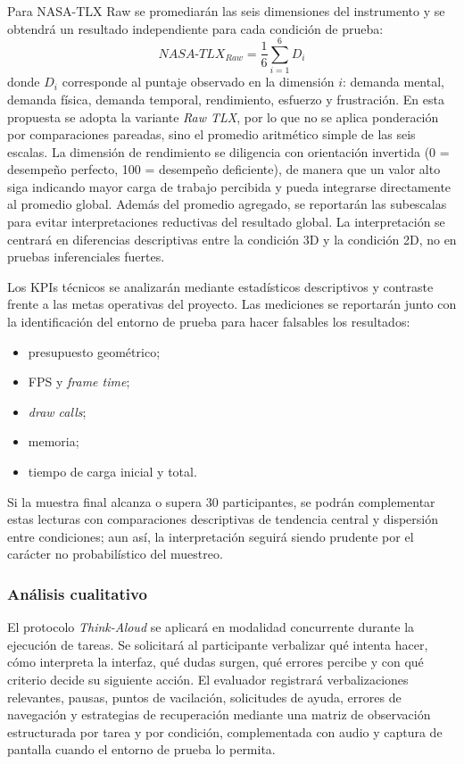 Para NASA-TLX Raw se promediar\'an las seis dimensiones del instrumento y se obtendr\'a un resultado independiente para cada condici\'on de prueba:
\[
NASA\text{-}TLX_{Raw} = \frac{1}{6}\sum_{i=1}^{6} D_i
\]
donde $D_i$ corresponde al puntaje observado en la dimensi\'on $i$: demanda mental, demanda f\'isica, demanda temporal, rendimiento, esfuerzo y frustraci\'on. En esta propuesta se adopta la variante \textit{Raw TLX}, por lo que no se aplica ponderaci\'on por comparaciones pareadas, sino el promedio aritm\'etico simple de las seis escalas. La dimensi\'on de rendimiento se diligencia con orientaci\'on invertida (0 = desempe\~no perfecto, 100 = desempe\~no deficiente), de manera que un valor alto siga indicando mayor carga de trabajo percibida y pueda integrarse directamente al promedio global. Adem\'as del promedio agregado, se reportar\'an las subescalas para evitar interpretaciones reductivas del resultado global. La interpretaci\'on se centrar\'a en diferencias descriptivas entre la condici\'on 3D y la condici\'on 2D, no en pruebas inferenciales fuertes.

Los KPIs t\'ecnicos se analizar\'an mediante estad\'isticos descriptivos y contraste frente a las metas operativas del proyecto. Las mediciones se reportar\'an junto con la identificaci\'on del entorno de prueba para hacer falsables los resultados:
\begin{itemize}
    \item presupuesto geom\'etrico;
    \item FPS y \textit{frame time};
    \item \textit{draw calls};
    \item memoria;
    \item tiempo de carga inicial y total.
\end{itemize}

Si la muestra final alcanza o supera 30 participantes, se podr\'an complementar estas lecturas con comparaciones descriptivas de tendencia central y dispersi\'on entre condiciones; aun as\'i, la interpretaci\'on seguir\'a siendo prudente por el car\'acter no probabil\'istico del muestreo.

\subsubsection{An\'alisis cualitativo}

El protocolo \textit{Think-Aloud} se aplicar\'a en modalidad concurrente durante la ejecuci\'on de tareas. Se solicitar\'a al participante verbalizar qu\'e intenta hacer, c\'omo interpreta la interfaz, qu\'e dudas surgen, qu\'e errores percibe y con qu\'e criterio decide su siguiente acci\'on. El evaluador registrar\'a verbalizaciones relevantes, pausas, puntos de vacilaci\'on, solicitudes de ayuda, errores de navegaci\'on y estrategias de recuperaci\'on mediante una matriz de observaci\'on estructurada por tarea y por condici\'on, complementada con audio y captura de pantalla cuando el entorno de prueba lo permita.

